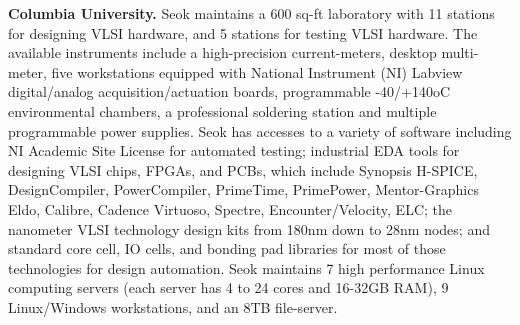 \noindent
\textbf{Columbia University.} 
Seok maintains a 600 sq-ft laboratory with 11 stations for designing VLSI hardware, and 5 stations for testing VLSI hardware. 
The available instruments include a high-precision current-meters, desktop multi-meter, five workstations equipped with National Instrument (NI) Labview digital/analog acquisition/actuation boards, programmable -40/+140oC environmental chambers, a professional soldering station and multiple programmable power supplies. 
Seok has accesses to a variety of software including NI Academic Site License for automated testing; industrial EDA tools for designing VLSI chips, FPGAs, and PCBs, which include Synopsis H-SPICE, DesignCompiler, PowerCompiler, PrimeTime, PrimePower, Mentor-Graphics Eldo, Calibre, Cadence Virtuoso, Spectre, Encounter/Velocity, ELC; the nanometer VLSI technology design kits from 180nm down to 28nm nodes; and standard core cell, IO cells, and bonding pad libraries for most of those technologies for design automation. 
Seok maintains 7 high performance Linux computing servers (each server has 4 to 24 cores and 16-32GB RAM), 9 Linux/Windows workstations, and an 8TB file-server. 

